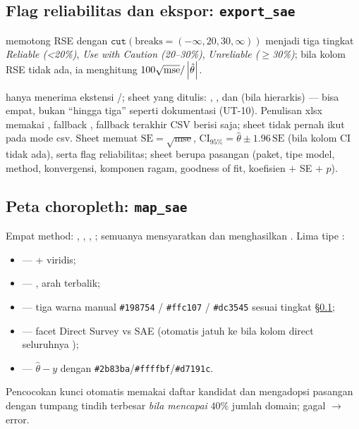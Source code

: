 \subsection{Flag reliabilitas dan ekspor: \texttt{export\_sae}}\label{sec:export}

 memotong RSE dengan
$\texttt{cut}(\text{breaks}=(-\infty,20,30,\infty))$ menjadi tiga tingkat
\emph{Reliable (\textless 20\%)}, \emph{Use with Caution (20--30\%)},
\emph{Unreliable ($\ge$30\%)}; bila kolom RSE tidak ada, ia menghitung
$100\sqrt{\mathrm{mse}}/\left|\hat\theta\right|$. 

 hanya
menerima ekstensi /; sheet yang ditulis:
, ,  dan
 (bila hierarkis) --- bisa empat, bukan ``hingga
tiga'' seperti dokumentasi (UT-10). Penulisan xlsx memakai
, fallback , fallback terakhir CSV berisi
 saja; sheet  tidak pernah ikut pada mode
csv. Sheet  memuat
$\mathrm{SE}=\sqrt{\mathrm{mse}}$, $\mathrm{CI}_{95\%}=\hat\theta\pm1.96\,\mathrm{SE}$
(bila kolom CI tidak ada), serta flag reliabilitas; sheet
 berupa pasangan  (paket, tipe
model, method, konvergensi, komponen ragam, goodness of fit, koefisien
$+$ SE $+$ $p$).

\subsection{Peta choropleth: \texttt{map\_sae}}\label{sec:map}

Empat method: , , ,
; semuanya mensyaratkan  dan menghasilkan
. Lima tipe :
\begin{itemize}
  \item {} ---  + viridis;
  \item {} --- , arah terbalik;
  \item {} --- tiga warna manual
        \texttt{\#198754} / \texttt{\#ffc107} / \texttt{\#dc3545}
        sesuai tingkat \S\ref{sec:export};
  \item {} --- facet Direct Survey vs SAE (otomatis jatuh ke
         bila kolom direct seluruhnya );
  \item {} --- $\hat\theta-y$ dengan 
        \texttt{\#2b83ba}/\texttt{\#ffffbf}/\texttt{\#d7191c}.
\end{itemize}
Pencocokan kunci otomatis memakai daftar kandidat
 dan mengadopsi pasangan dengan tumpang tindih terbesar
\emph{bila mencapai} $40\%$ jumlah domain; gagal $\to$ error.

